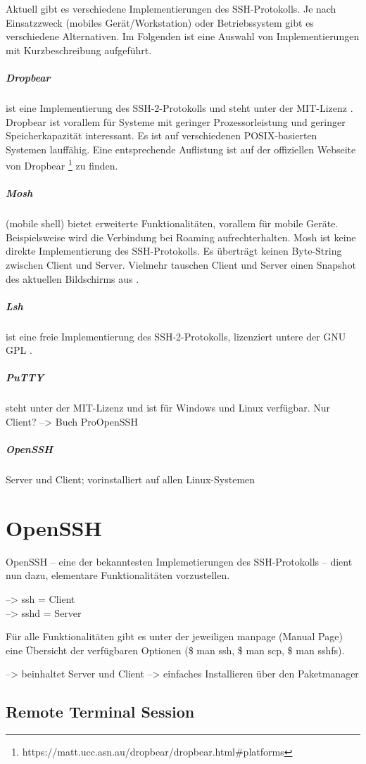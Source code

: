 \documentclass[ngerman,pdf]{wkcms}    %
\begin{document}
Aktuell gibt es verschiedene Implementierungen des SSH-Protokolls. Je nach Einsatzzweck (mobiles Gerät/Workstation) oder Betriebssystem gibt es verschiedene Alternativen. Im Folgenden ist eine Auswahl von Implementierungen mit Kurzbeschreibung aufgeführt.

\subparagraph{Dropbear} ist eine Implementierung des SSH-2-Protokolls und steht unter der MIT-Lizenz \cite{dropbear}. Dropbear ist vorallem für Systeme mit geringer Prozessorleistung und geringer Speicherkapazität interessant. Es ist auf verschiedenen POSIX-basierten Systemen lauffähig. Eine entsprechende Auflistung ist auf der offiziellen Webseite von Dropbear \footnote{https://matt.ucc.asn.au/dropbear/dropbear.html\#platforms} zu finden.

\subparagraph{Mosh} (mobile shell) bietet erweiterte Funktionalitäten, vorallem für mobile Geräte. Beispielsweise wird die Verbindung bei Roaming aufrechterhalten. Mosh ist keine direkte Implementierung des SSH-Protokolls. Es überträgt keinen Byte-String zwischen Client und Server. Vielmehr tauschen Client und Server einen Snapshot des aktuellen Bildschirms aus \cite{mosh}.

\subparagraph{Lsh} ist eine freie Implementierung des SSH-2-Protokolls, lizenziert untere der GNU GPL \cite{lsh}. 

\subparagraph{PuTTY} steht unter der MIT-Lizenz und ist für Windows und Linux verfügbar. Nur Client? \cite{putty} --> Buch ProOpenSSH

\subparagraph{OpenSSH} Server und Client; vorinstalliert auf allen Linux-Systemen




\section{OpenSSH}

OpenSSH -- eine der bekanntesten Implemetierungen des SSH-Protokolls -- dient nun dazu,
elementare Funktionalitäten vorzustellen.

--> ssh = Client \\
--> sshd = Server

Für alle Funktionalitäten gibt es unter der jeweiligen \IT manpage (Manual Page) eine Übersicht der verfügbaren Optionen (\$ man ssh, \$ man scp, \$ man sshfs). 

--> beinhaltet Server und Client
--> einfaches Installieren über den Paketmanager

\subsection{Remote Terminal Session}
\end{document}
